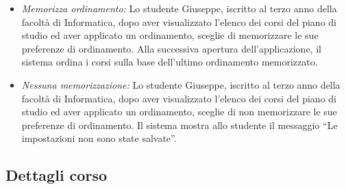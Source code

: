 \begin{itemize}
	\item \textit{Memorizza ordinamento:}
	Lo studente Giuseppe, iscritto al terzo anno della facoltà di Informatica, dopo aver visualizzato l’elenco dei corsi del piano di studio ed aver applicato un ordinamento, sceglie di memorizzare le sue preferenze di ordinamento. Alla successiva apertura dell’applicazione, il sistema ordina i corsi sulla base dell'ultimo ordinamento memorizzato.
	
	\item \textit{Nessuna memorizzazione:}
	Lo studente Giuseppe, iscritto al terzo anno della facoltà di Informatica, dopo aver visualizzato l’elenco dei corsi del piano di studio ed aver applicato un ordinamento, sceglie di non memorizzare le sue preferenze di ordinamento. Il sistema mostra allo studente il messaggio “Le impostazioni non sono state salvate”. 
\end{itemize}

\subsection{Dettagli corso}
